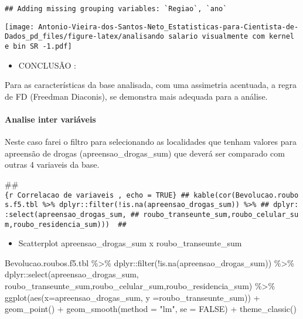 \documentclass[
]{article}
\newenvironment{Shaded}{\begin{snugshade}}{\end{snugshade}}
\newcommand{\AttributeTok}[1]{\textcolor[rgb]{0.77,0.63,0.00}{#1}}
\newcommand{\ConstantTok}[1]{\textcolor[rgb]{0.00,0.00,0.00}{#1}}
\newcommand{\FunctionTok}[1]{\textcolor[rgb]{0.00,0.00,0.00}{#1}}
\newcommand{\NormalTok}[1]{#1}
\newcommand{\SpecialCharTok}[1]{\textcolor[rgb]{0.00,0.00,0.00}{#1}}
\newcommand{\StringTok}[1]{\textcolor[rgb]{0.31,0.60,0.02}{#1}}
\providecommand{\tightlist}{%
  \setlength{\itemsep}{0pt}\setlength{\parskip}{0pt}}
\begin{document}
\begin{verbatim}
## Adding missing grouping variables: `Regiao`, `ano`
\end{verbatim}

\texttt{[image: Antonio-Vieira-dos-Santos-Neto\_Estatisticas-para-Cientista-de-Dados\_pd\_files/figure-latex/analisando salario visualmente com kernel e bin SR -1.pdf]}

\begin{itemize}
\tightlist
\item
  CONCLUSÃO :
\end{itemize}

Para as características da base analisada, com uma assimetria acentuada, a regra de FD (Freedman Diaconis), se demonstra mais adequada para a análise.

\hypertarget{analise-inter-variuxe1veis}{%
\paragraph{Analise inter variáveis}\label{analise-inter-variuxe1veis}}

Neste caso farei o filtro para selecionando as localidades que tenham valores para apreensão de drogas (apreensao\_drogas\_sum) que deverá ser comparado com outras 4 variaveis da base.

\#\#\texttt{\{r\ Correlacao\ de\ variaveis\ ,\ echo\ =\ TRUE\}\ \#\#\ kable(cor(Bevolucao.roubos.f5.tbl\ \%\textgreater{}\%\ dplyr::filter(!is.na(apreensao\_drogas\_sum))\ \%\textgreater{}\%\ \#\#\ dplyr::select(apreensao\_drogas\_sum,\ \#\#\ roubo\_transeunte\_sum,roubo\_celular\_sum,roubo\_residencia\_sum)))\ \ \#\#}

\begin{itemize}
\tightlist
\item
  Scatterplot apreensao\_drogas\_sum x roubo\_transeunte\_sum
\end{itemize}

\begin{Shaded}
\begin{Highlighting}[]
\NormalTok{Bevolucao.roubos.f5.tbl }\SpecialCharTok{\%\textgreater{}\%}\NormalTok{ dplyr}\SpecialCharTok{::}\FunctionTok{filter}\NormalTok{(}\SpecialCharTok{!}\FunctionTok{is.na}\NormalTok{(apreensao\_drogas\_sum)) }\SpecialCharTok{\%\textgreater{}\%}\NormalTok{ dplyr}\SpecialCharTok{::}\FunctionTok{select}\NormalTok{(apreensao\_drogas\_sum, roubo\_transeunte\_sum,roubo\_celular\_sum,roubo\_residencia\_sum) }\SpecialCharTok{\%\textgreater{}\%} \FunctionTok{ggplot}\NormalTok{(}\FunctionTok{aes}\NormalTok{(}\AttributeTok{x=}\NormalTok{apreensao\_drogas\_sum, }\AttributeTok{y =}\NormalTok{roubo\_transeunte\_sum)) }\SpecialCharTok{+} \FunctionTok{geom\_point}\NormalTok{() }\SpecialCharTok{+} \FunctionTok{geom\_smooth}\NormalTok{(}\AttributeTok{method =} \StringTok{"lm"}\NormalTok{, }\AttributeTok{se =} \ConstantTok{FALSE}\NormalTok{) }\SpecialCharTok{+} \FunctionTok{theme\_classic}\NormalTok{()}
\end{Highlighting}
\end{Shaded}
\end{document}

